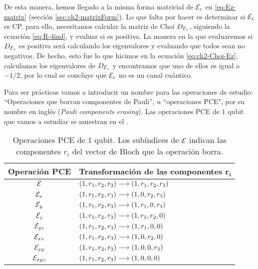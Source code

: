 De esta manera, hemos llegado a la misma forma matricial de $\mathcal{E}_z$
en \eqref{eq:Ez-matrix} (sección \ref{sec:ch2-matrixForm}). 
Lo que falta por hacer es determinar si $\mathcal{E}_z$ es CP, 
para ello, necesitamos calcular la matriz
de Choi $D_{\mathcal{E}_z}$, siguiendo la ecuación \eqref{eq:R-4ind}, y 
evaluar si es positiva. La manera en la que evaluaremos 
si $D_{\mathcal{E}_z}$ es positiva será calculando los eigenvalores 
y evaluando que todos sean no negativos. 
De hecho, esto fue lo que hicimos en 
la ecuación \eqref{eq:ch2-Choi-Ez},
calculamos los eigenvalores de $D_{\mathcal{E}_z}$ y  
encontramos que uno de ellos es igual a $-1/2$, 
por lo cual se concluye que $\mathcal{E}_z$ no es un canal cuántico.

Para ser prácticos vamos a introducir un nombre para
las operaciones de estudio: ``Operaciones
que borran componentes de Pauli'', u ``operaciones PCE",
por su nombre en inglés (\textit{Pauli components erasing}). 
Las operaciones PCE de 1 qubit que vamos a estudiar 
se muestran en el .
\begin{table}
\centering
\begin{tabular}{|c|l|} 
\hline
\textbf{Operación PCE} & 
\textbf{Transformación de las componentes} $\mathbf{r_i}$ \\
\hline
$\mathcal{E}_{}$ & \hspace{1.2cm}$\qty(1,r_1,r_2,r_3)\longrightarrow\qty(1,r_1,r_2,r_3)$ \\ 
\hline 
$\mathcal{E}_{x}$ & \hspace{1.2cm}$\qty(1,r_1,r_2,r_3)\longrightarrow\qty(1,0,r_2,r_3)$ \\ 
\hline 
$\mathcal{E}_{y}$ & \hspace{1.2cm}$\qty(1,r_1,r_2,r_3)\longrightarrow\qty(1,r_1,0,r_3)$ \\ 
\hline 
$\mathcal{E}_{z}$ & \hspace{1.2cm}$\qty(1,r_1,r_2,r_3)\longrightarrow\qty(1,r_1,r_2,0)$ \\ 
\hline 
$\mathcal{E}_{yz}$ & \hspace{1.2cm}$\qty(1,r_1,r_2,r_3)\longrightarrow\qty(1,r_1,0,0)$ \\ 
\hline 
$\mathcal{E}_{xz}$ & \hspace{1.2cm}$\qty(1,r_1,r_2,r_3)\longrightarrow\qty(1,0,r_2,0)$ \\ 
\hline 
$\mathcal{E}_{xy}$ & \hspace{1.2cm}$\qty(1,r_1,r_2,r_3)\longrightarrow\qty(1,0,0,r_3)$ \\ 
\hline 
$\mathcal{E}_{xyz}$ & \hspace{1.2cm}$\qty(1,r_1,r_2,r_3)\longrightarrow\qty(1,0,0,0)$ \\ 
\hline
\end{tabular}   
\caption{Operaciones PCE de 1 qubit. 
Los subíndices de $\mathcal{E}$ indican las componentes $r_i$ 
del vector de Bloch que la operación borra.}
\label{cuadro:operacionesPCE-1q}
\end{table}


